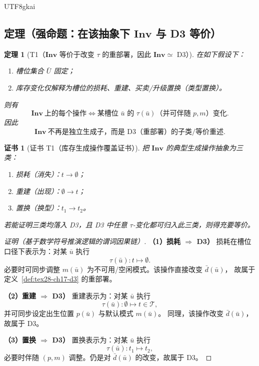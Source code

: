 \documentclass[12pt]{article}
\newtheorem{theorem}{定理}[section]
\newtheorem{Certificate}{证书}[section]
\begin{document}
\begin{CJK*}{UTF8}{gkai}
\subsection{定理（强命题：在该抽象下 $\mathbf{Inv}$ 与 D3 等价）}
\label{subsec:tex28-ch17-thm}

\begin{theorem}[T1（$\mathbf{Inv}$ 等价于改变 $\tau$ 的重部署，因此 $\mathbf{Inv}\simeq$ D3）]
\label{thm:tex28-ch17-t1}
在如下假设下：
\begin{enumerate}
  \item 槽位集合 $\bar U$ 固定；
  \item 库存变化仅解释为槽位的损耗、重建、买卖/升级置换（类型置换）。
\end{enumerate}
则有
\[
  \boxed{
    \mathbf{Inv}\ \text{上的每个操作}
    \Longleftrightarrow
    \text{某槽位 }\bar u\text{ 的 }\tau(\bar u)\text{（并可伴随 }p,m\text{）变化}
  }.
\]
因此
\[
  \boxed{
    \mathbf{Inv}\ \text{不再是独立生成子，而是 D3（重部署）的子类/等价重述}
  }.
\]
\end{theorem}

\begin{Certificate}[证书 T1（库存生成操作覆盖证书）]
\label{cert:tex28-ch17-t1}
把 $\mathbf{Inv}$ 的典型生成操作抽象为三类：
\begin{enumerate}
  \item 损耗（消失）：$t\to\emptyset$；
  \item 重建（出现）：$\emptyset\to t$；
  \item 置换（换型）：$t_1\to t_2$。
\end{enumerate}
若能证明三类均落入 D3，且 D3 中任意 $\tau$-变化都可归入此三类，则得充要等价。
\end{Certificate}

\begin{proof}[证明（基于数学符号推演逻辑的谓词因果链）]
\textbf{（1）损耗 $\Rightarrow$ D3）}
损耗在槽位口径下表示为：对某 $\bar u$ 执行
\[
  \tau(\bar u):t\mapsto\emptyset.
\]
必要时可同步调整 $m(\bar u)$ 为不可用/空闲模式。该操作直接改变 $\bar d(\bar u)$，
故属于定义~\ref{def:tex28-ch17-d3} 的重部署。

\textbf{（2）重建 $\Rightarrow$ D3）}
重建表示为：对某 $\bar u$ 执行
\[
  \tau(\bar u):\emptyset\mapsto t\in\mathcal T,
\]
并可同步设定出生位置 $p(\bar u)$ 与默认模式 $m(\bar u)$。
同理，该操作改变 $\bar d(\bar u)$，故属于 D3。

\textbf{（3）置换 $\Rightarrow$ D3）}
置换表示为：对某 $\bar u$ 执行
\[
  \tau(\bar u):t_1\mapsto t_2,
\]
必要时伴随 $(p,m)$ 调整。仍是对 $\bar d(\bar u)$ 的改变，故属于 D3。


\end{proof}
\end{CJK*}
\end{document}
